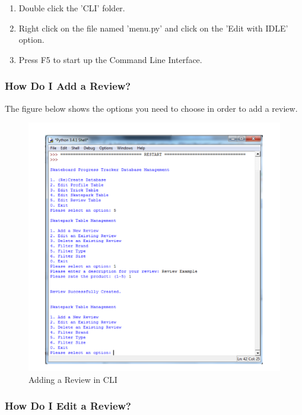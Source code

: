 \begin{enumerate}
\item Double click the 'CLI' folder.
\item Right click on the file named 'menu.py' and click on the 'Edit with IDLE' option.
\item Press F5 to start up the Command Line Interface.
\end{enumerate}

\subsubsection{How Do I Add a Review?} \label{AddReview} %

The figure below shows the options you need to choose in order to add a review. 

\begin{figure}[H]
    \includegraphics[width=\textwidth]{./Manual/Images/AddReview.pdf}
    \caption{Adding a Review in CLI} \label{fig:Add Review}
\end{figure}



\subsubsection{How Do I Edit a Review?} \label{EditReview}

